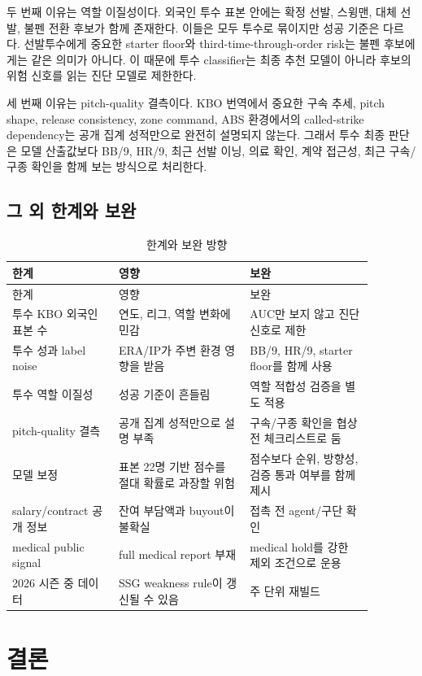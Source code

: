 \documentclass[11pt,a4paper]{article}
\begin{document}
두 번째 이유는 역할 이질성이다. 외국인 투수 표본 안에는 확정 선발, 스윙맨, 대체 선발, 불펜 전환 후보가 함께 존재한다. 이들은 모두 투수로 묶이지만 성공 기준은 다르다. 선발투수에게 중요한 starter floor와 third-time-through-order risk는 불펜 후보에게는 같은 의미가 아니다. 이 때문에 투수 classifier는 최종 추천 모델이 아니라 후보의 위험 신호를 읽는 진단 모델로 제한한다.

세 번째 이유는 pitch-quality 결측이다. KBO 번역에서 중요한 구속 추세, pitch shape, release consistency, zone command, ABS 환경에서의 called-strike dependency는 공개 집계 성적만으로 완전히 설명되지 않는다. 그래서 투수 최종 판단은 모델 산출값보다 BB/9, HR/9, 최근 선발 이닝, 의료 확인, 계약 접근성, 최근 구속/구종 확인을 함께 보는 방식으로 처리한다.

\subsection{그 외 한계와 보완}
\begin{longtable}{L{0.26\linewidth}L{0.32\linewidth}L{0.30\linewidth}}
\caption{한계와 보완 방향}
\label{tab:limitations}\\
\toprule
한계 & 영향 & 보완 \\
\midrule
\endfirsthead
\toprule
한계 & 영향 & 보완 \\
\midrule
\endhead
투수 KBO 외국인 표본 수 & 연도, 리그, 역할 변화에 민감 & AUC만 보지 않고 진단 신호로 제한 \\
투수 성과 label noise & ERA/IP가 주변 환경 영향을 받음 & BB/9, HR/9, starter floor를 함께 사용 \\
투수 역할 이질성 & 성공 기준이 흔들림 & 역할 적합성 검증을 별도 적용 \\
pitch-quality 결측 & 공개 집계 성적만으로 설명 부족 & 구속/구종 확인을 협상 전 체크리스트로 둠 \\
모델 보정 & 표본 22명 기반 점수를 절대 확률로 과장할 위험 & 점수보다 순위, 방향성, 검증 통과 여부를 함께 제시 \\
salary/contract 공개 정보 & 잔여 부담액과 buyout이 불확실 & 접촉 전 agent/구단 확인 \\
medical public signal & full medical report 부재 & medical hold를 강한 제외 조건으로 운용 \\
2026 시즌 중 데이터 & SSG weakness rule이 갱신될 수 있음 & 주 단위 재빌드 \\
\bottomrule
\end{longtable}

\section{결론}
\end{document}
